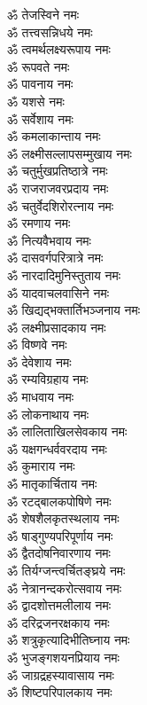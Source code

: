 \begin{multicols}{2}
\begin{flushleft}
        ॐ तेजस्विने नमः\\
        ॐ तत्त्वसन्निधये नमः\\
        ॐ त्वमर्थलक्ष्यरूपाय नमः\\
        ॐ रूपवते नमः\\
        ॐ पावनाय नमः\\
        ॐ यशसे नमः\\
        ॐ सर्वेशाय नमः\\
        ॐ कमलाकान्ताय नमः\\
        ॐ लक्ष्मीसल्लापसम्मुखाय नमः\\
        ॐ चतुर्मुखप्रतिष्ठात्रे नमः\hfill{}\\
                                                        
        ॐ राजराजवरप्रदाय नमः\\
        ॐ चतुर्वेदशिरोरत्नाय नमः\\
        ॐ रमणाय नमः\\
        ॐ नित्यवैभवाय नमः\\
        ॐ दासवर्गपरित्रात्रे नमः\\
        ॐ नारदादिमुनिस्तुताय नमः\\
        ॐ यादवाचलवासिने नमः\\
        ॐ खिद्यद्भक्तार्तिभञ्जनाय नमः\\
        ॐ लक्ष्मीप्रसादकाय नमः\\
        ॐ विष्णवे नमः\hfill{}\\
                                                        
        ॐ देवेशाय नमः\\
        ॐ रम्यविग्रहाय नमः\\
        ॐ माधवाय नमः\\
        ॐ लोकनाथाय नमः\\
        ॐ लालिताखिलसेवकाय नमः\\
        ॐ यक्षगन्धर्ववरदाय नमः\\
        ॐ कुमाराय नमः\\
        ॐ मातृकार्चिताय नमः\\
        ॐ रटद्बालकपोषिणे नमः\\
        ॐ शेषशैलकृतस्थलाय नमः\hfill{}\\
                                                        
        ॐ षाड्गुण्यपरिपूर्णाय नमः\\
        ॐ द्वैतदोषनिवारणाय नमः\\
        ॐ तिर्यग्जन्त्वर्चितङ्घ्रये नमः\\
        ॐ नेत्रानन्दकरोत्सवाय नमः\\
        ॐ द्वादशोत्तमलीलाय नमः\\
        ॐ दरिद्रजनरक्षकाय नमः\\
        ॐ शत्रुकृत्यादिभीतिघ्नाय नमः\\
        ॐ भुजङ्गशयनप्रियाय नमः\\
        ॐ जाग्रद्रहस्यावासाय नमः\\
        ॐ शिष्टपरिपालकाय नमः\hfill{}\\
                                                        

\end{flushleft}
\end{multicols}
